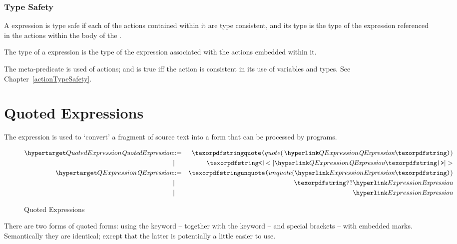 \subsubsection{Type Safety}
A  expression is type safe if each of the actions contained within it are type consistent, and its type is the type of the expression referenced in the  actions within the body of the . 

The type of a  expression is the type of the expression associated with the  actions embedded within it.

\begin{prooftree}
\end{prooftree}
\begin{aside}
The \safeinf{} meta-predicate is used of actions; and is true iff the action is consistent in its use of variables and types. See Chapter~\vref{actionTypeSafety}.
\end{aside}

\section{Quoted Expressions}
\label{quotedText}

The  expression is used to `convert' a fragment of \Sr source text into a form that can be processed by \Sr programs.

\begin{figure}[htbp]
\begin{eqnarray*}
\ntDef{QuotedExpression}&\arrow&\q{quote(}\,\ntRef{QExpression}\q{)}\\
&\choice&\q{<|}\ntRef{QExpression}\q{|>}\\
\ntDef{QExpression}&\arrow&\q{unquote(}\ntRef{Expression}\q{)}\\
&\choice&\q{?}\ntRef{Expression}\\
&\choice&\ntRef{Expression}
\end{eqnarray*}
\caption{Quoted Expressions}
\label{quotedExpressionFig}
\end{figure}


There are two forms of quoted forms: using the  keyword -- together with the  keyword -- and special \q{<| |>} brackets -- with embedded  marks. Semantically they are identical; except that the latter is potentially a little easier to use.

